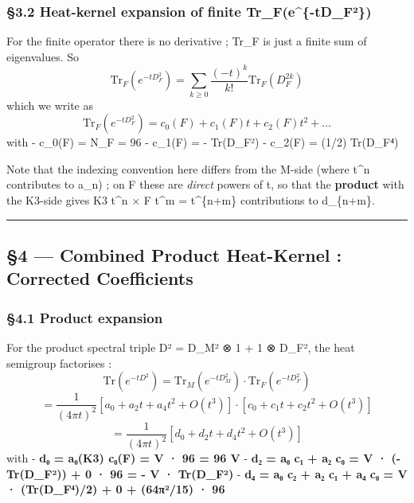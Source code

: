 \documentclass[
  11pt,
  a4paper,
]{article}
\begin{document}
\hypertarget{heat-kernel-expansion-of-finite-tr_fe-td_fuxb2}{%
\subsubsection{§3.2 Heat-kernel expansion of finite Tr\_F(e\^{}\{-tD\_F²\})}\label{heat-kernel-expansion-of-finite-tr_fe-td_fuxb2}}

For the finite operator there is no derivative ; Tr\_F is just a finite sum of eigenvalues. So
\[
\mathrm{Tr}_F(e^{-t D_F^2}) = \sum_{k\geq 0} \frac{(-t)^k}{k!} \mathrm{Tr}_F(D_F^{2k})
\]
which we write as
\[
\mathrm{Tr}_F(e^{-t D_F^2}) = c_0(F) + c_1(F) t + c_2(F) t^2 + \dots
\]
with
- c\_0(F) = N\_F = 96
- c\_1(F) = - Tr(D\_F²)
- c\_2(F) = (1/2) Tr(D\_F⁴)

Note that the indexing convention here differs from the M-side (where t\^{}n contributes to a\_n) ; on F these are \emph{direct} powers of t, so that the \textbf{product} with the K3-side gives K3 t\^{}n × F t\^{}m = t\^{}\{n+m\} contributions to d\_\{n+m\}.

\begin{center}\rule{0.5\linewidth}{0.5pt}\end{center}

\hypertarget{combined-product-heat-kernel-corrected-coefficients}{%
\subsection{§4 --- Combined Product Heat-Kernel : Corrected Coefficients}\label{combined-product-heat-kernel-corrected-coefficients}}

\hypertarget{product-expansion}{%
\subsubsection{§4.1 Product expansion}\label{product-expansion}}

For the product spectral triple D² = D\_M² ⊗ 1 + 1 ⊗ D\_F², the heat semigroup factorises :
\[
\mathrm{Tr}(e^{-tD^2}) = \mathrm{Tr}_M(e^{-tD_M^2}) \cdot \mathrm{Tr}_F(e^{-tD_F^2})
\]
\[
= \frac{1}{(4\pi t)^2}\left[ a_0 + a_2 t + a_4 t^2 + O(t^3) \right] \cdot \left[ c_0 + c_1 t + c_2 t^2 + O(t^3) \right]
\]
\[
= \frac{1}{(4\pi t)^2} \left[ d_0 + d_2 t + d_4 t^2 + O(t^3) \right]
\]
with
- \textbf{d₀ = a₀(K3) c₀(F) = V · 96 = 96 V}
- \textbf{d₂ = a₀ c₁ + a₂ c₀ = V · (- Tr(D\_F²)) + 0 · 96 = - V · Tr(D\_F²)}
- \textbf{d₄ = a₀ c₂ + a₂ c₁ + a₄ c₀ = V · (Tr(D\_F⁴)/2) + 0 + (64π²/15) · 96}
\end{document}
